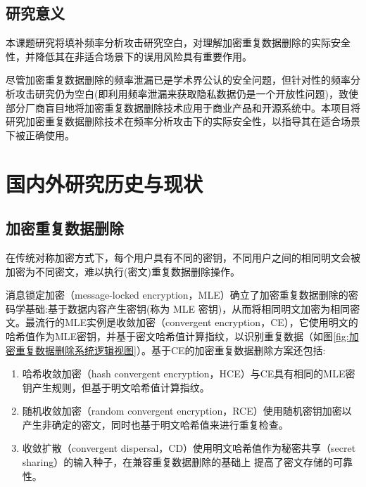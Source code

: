 \subsection{研究意义}

本课题研究将填补频率分析攻击研究空白，对理解加密重复数据删除的实际安全性，并降低其在非适合场景下的误用风险具有重要作用。

尽管加密重复数据删除的频率泄漏已是学术界公认的安全问题，但针对性的频率分析攻击研究仍为空白(即利用频率泄漏来获取隐私数据仍是一个开放性问题)，致使部分厂商盲目地将加密重复数据删除技术应用于商业产品和开源系统中。本项目将研究加密重复数据删除技术在频率分析攻击下的实际安全性，以指导其在适合场景下被正确使用。


\section{国内外研究历史与现状}

\subsection{加密重复数据删除}
\label{sec:加密重复数据删除}
在传统对称加密方式下，每个用户具有不同的密钥，不同用户之间的相同明文会被加密为不同密文，难以执行(密文)重复数据删除操作。

消息锁定加密（message-locked encryption，MLE）确立了加密重复数据删除的密码学基础:基于数据内容产生密钥(称为 MLE 密钥)，从而将相同明文加密为相同密文。最流行的MLE实例是收敛加密（convergent encryption，CE），它使用明文的哈希值作为MLE密钥，并基于密文哈希值计算指纹，以识别重复数据（如图\ref{fig:加密重复数据删除系统逻辑视图}）。基于CE的加密重复数据删除方案还包括:

\begin{enumerate}
    \item 哈希收敛加密（hash convergent encryption，HCE）与CE具有相同的MLE密钥产生规则，但基于明文哈希值计算指纹。
    \item 随机收敛加密（random convergent encryption，RCE）使用随机密钥加密以产生非确定的密文，同时也基于明文哈希值来进行重复检查。
    \item 收敛扩散（convergent dispersal，CD）使用明文哈希值作为秘密共享（secret sharing）的输入种子，在兼容重复数据删除的基础上 提高了密文存储的可靠性。
\end{enumerate}

